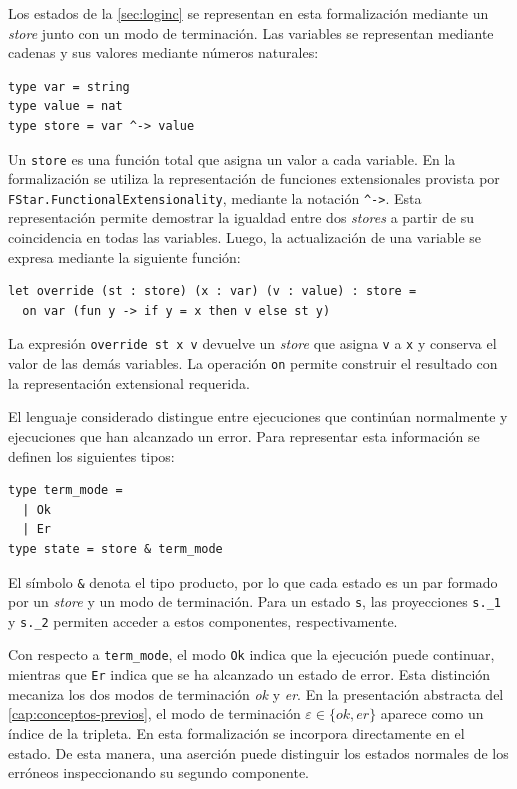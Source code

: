 \documentclass[a4paper,	11pt]{report}
\newif\ifdraft\drafttrue
\newcommand{\comm}[3]{\ifdraft{{\color{#1}[#2: #3]}}\fi}
\newcommand{\guido}[1]{\comm{blue}{Guido}{#1}}
\begin{document}
Los estados de la \autoref{sec:loginc} se representan en esta formalización mediante un \emph{store} junto con un modo de terminación.
Las variables se representan mediante cadenas y sus valores mediante números naturales:

\begin{lstlisting}
type var = string
type value = nat
type store = var ^-> value
\end{lstlisting}

Un \lstinline|store| es una función total que asigna un valor a cada variable.
En la formalización se utiliza la representación de funciones extensionales provista por
\lstinline|FStar.FunctionalExtensionality|,
mediante la notación \lstinline|^->|.
Esta representación permite demostrar la igualdad entre dos \emph{stores} a partir de su coincidencia en todas las variables.
Luego, la actualización de una variable se expresa mediante la siguiente función:

\begin{lstlisting}
let override (st : store) (x : var) (v : value) : store =
  on var (fun y -> if y = x then v else st y)
\end{lstlisting}
La expresión
\lstinline|override st x v| devuelve un \emph{store} que asigna \lstinline|v| a \lstinline|x| y conserva el valor de las demás variables.
La operación \lstinline|on| permite construir el resultado con la representación extensional requerida.

El lenguaje considerado distingue entre ejecuciones que continúan normalmente y ejecuciones que han alcanzado un error.
Para representar esta información se definen los siguientes tipos:

\begin{lstlisting}
type term_mode =
  | Ok
  | Er
type state = store & term_mode
\end{lstlisting}

El símbolo \lstinline|&| denota el tipo producto,
por lo que cada estado es un par formado por un \emph{store} y un modo de terminación.
Para un estado \lstinline|s|,
las proyecciones \lstinline|s._1| y \lstinline|s._2| permiten acceder a estos componentes,
respectivamente.

Con respecto a \lstinline|term_mode|,
el modo \lstinline|Ok| indica que la ejecución puede continuar,
mientras que \lstinline|Er| indica que se ha alcanzado un estado de error.
Esta distinción mecaniza los dos modos de terminación \emph{ok} y \emph{er}.
En la presentación abstracta del \autoref{cap:conceptos-previos},
el modo de terminación $\varepsilon \in \{ok, er\}$ aparece como un índice de la tripleta.
En esta formalización se incorpora directamente en el estado.
De esta manera,
una aserción puede distinguir los estados normales de los erróneos inspeccionando su segundo componente.
\end{document}
